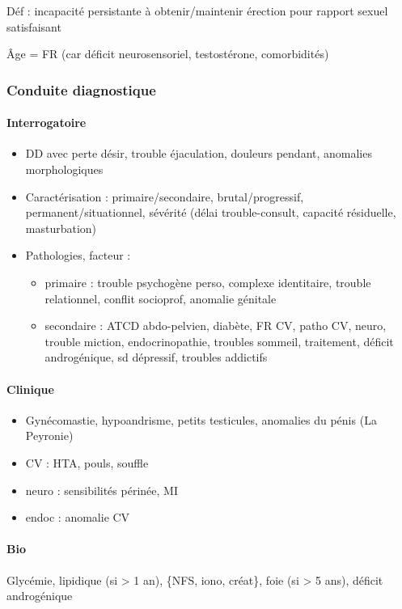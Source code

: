 \documentclass[11pt]{article}
\begin{document}
Déf : incapacité persistante à obtenir/maintenir érection pour rapport sexuel satisfaisant

Âge = FR (car déficit neurosensoriel, \inc testostérone, comorbidités)

\subsubsection{Conduite  diagnostique}
\label{sec:orgd04004c}
\paragraph{Interrogatoire}
\label{sec:org6de4bf7}
\begin{itemize}
\item DD avec perte désir, trouble éjaculation, douleurs pendant, anomalies morphologiques
\item Caractérisation : primaire/secondaire, brutal/progressif,
permanent/situationnel, sévérité (délai trouble-consult, capacité résiduelle,
masturbation)
\item Pathologies, facteur :
\begin{itemize}
\item primaire : trouble psychogène perso, complexe identitaire, trouble
relationnel, conflit socioprof, anomalie génitale
\item secondaire : ATCD abdo-pelvien, diabète, FR CV, patho CV, neuro, trouble
miction, endocrinopathie, troubles sommeil, traitement, déficit
androgénique, sd dépressif, troubles addictifs
\end{itemize}
\end{itemize}
\paragraph{Clinique}
\label{sec:org81b912a}
\begin{itemize}
\item Gynécomastie, hypoandrisme, petits testicules, anomalies du pénis (La Peyronie)
\item CV : HTA, pouls, souffle
\item neuro : sensibilités périnée, MI
\item endoc : anomalie CV
\end{itemize}
\paragraph{Bio}
\label{sec:org99a8f89}
Glycémie, lipidique (si > 1 an), \{NFS, iono, créat\}, foie (si > 5 ans), déficit
androgénique
\end{document}
